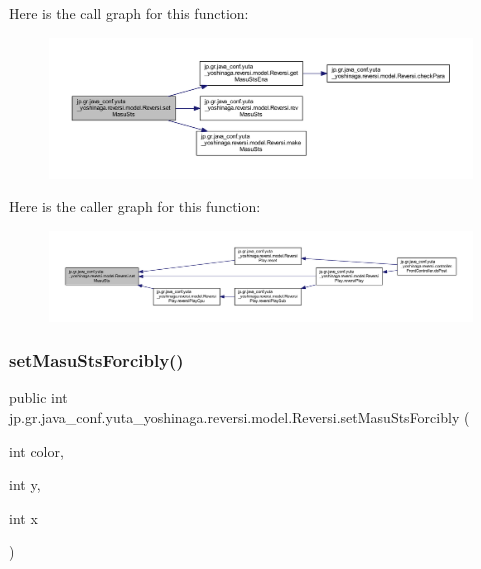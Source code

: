 Here is the call graph for this function\+:\nopagebreak
\begin{figure}[H]
\begin{center}
\leavevmode
\includegraphics[width=350pt]{classjp_1_1gr_1_1java__conf_1_1yuta__yoshinaga_1_1reversi_1_1model_1_1_reversi_a7abf9238b933653eec2908f6e1a863db_cgraph}
\end{center}
\end{figure}
Here is the caller graph for this function\+:\nopagebreak
\begin{figure}[H]
\begin{center}
\leavevmode
\includegraphics[width=350pt]{classjp_1_1gr_1_1java__conf_1_1yuta__yoshinaga_1_1reversi_1_1model_1_1_reversi_a7abf9238b933653eec2908f6e1a863db_icgraph}
\end{center}
\end{figure}
\mbox{\label{classjp_1_1gr_1_1java__conf_1_1yuta__yoshinaga_1_1reversi_1_1model_1_1_reversi_af2ba1c808c067c94106d04ccd5e25e3b}} 
\subsubsection{\texorpdfstring{set\+Masu\+Sts\+Forcibly()}{setMasuStsForcibly()}}
{\footnotesize\ttfamily public int jp.\+gr.\+java\+\_\+conf.\+yuta\+\_\+yoshinaga.\+reversi.\+model.\+Reversi.\+set\+Masu\+Sts\+Forcibly (\begin{DoxyParamCaption}\item[{int}]{color,  }\item[{int}]{y,  }\item[{int}]{x }\end{DoxyParamCaption})}



